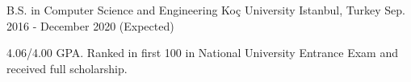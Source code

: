 
\vspace*{-1.5mm}

\begin{cventries}
 \cventry
    {B.S. in Computer Science and Engineering}
    {Koç University}
    {Istanbul, Turkey}
    {Sep. 2016 - December 2020 (Expected)}
    {
      \begin{cvitems}
	\item {4.06/4.00 GPA. Ranked in first 100 in National University Entrance Exam and received full scholarship.}
      \end{cvitems}
    }
\end{cventries}
